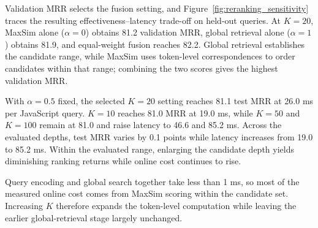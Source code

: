 \documentclass[11pt]{article}
\begin{document}
Validation MRR selects the fusion setting, and Figure~\ref{fig:reranking_sensitivity} traces the resulting effectiveness--latency trade-off on held-out queries. At \(K=20\), MaxSim alone (\(\alpha=0\)) obtains 81.2 validation MRR, global retrieval alone (\(\alpha=1\)) obtains 81.9, and equal-weight fusion reaches 82.2. Global retrieval establishes the candidate range, while MaxSim uses token-level correspondences to order candidates within that range; combining the two scores gives the highest validation MRR.

With \(\alpha=0.5\) fixed, the selected \(K=20\) setting reaches 81.1 test MRR at 26.0 ms per JavaScript query. \(K=10\) reaches 81.0 MRR at 19.0 ms, while \(K=50\) and \(K=100\) remain at 81.0 and raise latency to 46.6 and 85.2 ms. Across the evaluated depths, test MRR varies by 0.1 points while latency increases from 19.0 to 85.2 ms. Within the evaluated range, enlarging the candidate depth yields diminishing ranking returns while online cost continues to rise.

Query encoding and global search together take less than 1 ms, so most of the measured online cost comes from MaxSim scoring within the candidate set. Increasing \(K\) therefore expands the token-level computation while leaving the earlier global-retrieval stage largely unchanged.
\end{document}
